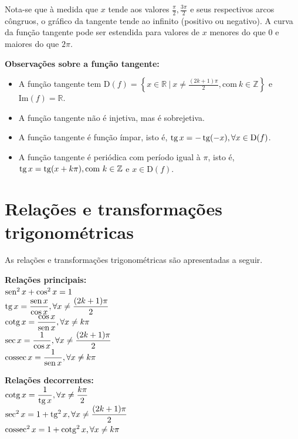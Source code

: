 Nota-se que à medida que $x$ tende aos valores $\frac{\pi}{2}, \frac{3\pi}{2}$ e seus respectivos arcos côngruos, o gráfico da tangente tende ao infinito (positivo ou negativo). A curva da função tangente pode ser estendida para valores de $x$ menores do que $0$ e maiores do que $2\pi$.

\textbf{Observações sobre a função tangente:}
\begin{itemize}
   \item A função tangente tem $\text{D}(f)=\left\{x \in \mathbb{R} \ | \ x \neq \frac{(2k+1)\pi}{2}, \text{com} \ k \in \mathbb{Z}\right\}$ e $\text{Im}(f)=\mathbb{R}$.
    \item A função tangente não é injetiva, mas é sobrejetiva.
    \item A função tangente é função ímpar, isto é, $\operatorname{tg} x= -\operatorname{tg} (-x),\forall x\in \text{D}(f)$.
    \item A função tangente é periódica com período igual à $\pi$, isto é, $\operatorname{tg} x=\operatorname{tg} (x+k\pi), \text{com} \ k\in \mathbb{Z}$ e $x\in \text{D}(f)$.
\end{itemize}

\section{Relações e transformações trigonométricas}

As relações e transformações trigonométricas são apresentadas a seguir.

\begin{tcolorbox}[colback=white,colframe=minha_cor,coltitle=black,title=Relações trigonométricas] 
    \begin{minipage}{6.5cm}
    \textbf{Relações principais:} \\[0.25cm]
    $\operatorname{sen}^2 x + \cos^2 x = 1$ \\[0.25cm]
    $\operatorname{tg} x = \displaystyle\frac{\operatorname{sen} x}{\cos x}, \forall x \neq \displaystyle\frac{(2k+1)\pi}{2}$ \\[0.25cm]
    $\operatorname{cotg} x = \displaystyle\frac{\cos x}{\operatorname{sen} x}, \forall x \neq k\pi$ \\[0.25cm]
    $\sec x = \displaystyle\frac{1}{\cos x}, \forall x \neq \displaystyle\frac{(2k+1)\pi}{2}$ \\[0.25cm]
    $\operatorname{cossec} x = \displaystyle\frac{1}{\operatorname{sen} x}, \forall x \neq k\pi$
\end{minipage}
\hfill
\begin{minipage}{6.5cm}
    \textbf{Relações decorrentes:} \\[0.25cm]
    $\operatorname{cotg} x = \displaystyle\frac{1}{\operatorname{tg} x}, \forall x \neq \displaystyle\frac{k\pi}{2}$ \\[0.25cm]
    $\sec^2x = 1 + \operatorname{tg}^2x, \forall x \neq \displaystyle\frac{(2k+1)\pi}{2}$ \\[0.25cm]
    $\operatorname{cossec}^2x = 1 + \operatorname{cotg}^2x, \forall x \neq k\pi$\\[1.50cm]
\end{minipage}
\end{tcolorbox}

